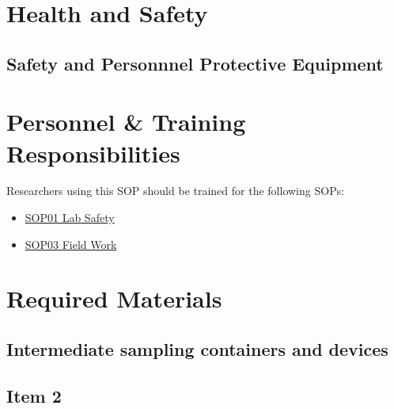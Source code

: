 \documentclass[12pt]{../SOP3_beta}\usepackage[]{graphicx}\usepackage[]{xcolor}
\begin{document}
\section{Health and Safety}

\subsection{Safety and Personnnel Protective Equipment}


\section{Personnel \& Training Responsibilities}

Researchers using this SOP should be trained for the following SOPs:

\begin{itemize}
  \item \href{}{SOP01 Lab Safety}
  \item \href{}{SOP03 Field Work}
\end{itemize}

\section{Required Materials}

\subsection{Intermediate sampling containers and devices}
\subsection{Item 2}
\end{document}
